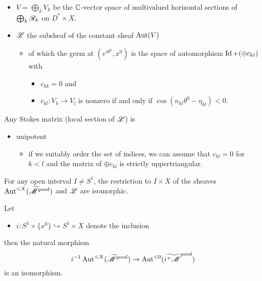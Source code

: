 \begin{itemize}
  \item $V=\bigoplus_kV_k$ be the $\mathbb{C}$-vector space of multivalued horizontal
    sections of $\bigoplus_k\mathscr{R}_k$ on $D^*\times X$.
  \item $\mathscr{L}$ the subsheaf of the constant sheaf $\operatorname{Aut}(V)$
    \begin{itemize}
      \item of which the germ at $(e^{i\theta^0},x^0)$ is
        the space of automorphism $\operatorname{Id}+(\oplus c_{kl})$ with
        \begin{itemize}
          \item $c_{kk}=0$ and
          \item $c_{kl}:V_k\to V_l$ is nonzero if and only if
            $\cos(n_{kl}\theta^0-\eta_{kl})<0$.
        \end{itemize}
    \end{itemize}
\end{itemize}
\begin{rem}
  Any Stokes matrix (local section of $\mathscr{L}$) is
  \begin{itemize}
    \item unipotent
      \begin{itemize}
        \item if we suitably order the set of indices, we can assume that
          $c_{kl}=0$ for $k<l$ and the matrix of $\oplus c_{kl}$ is strictly
          uppertriangular.
      \end{itemize}
  \end{itemize}
\end{rem}
\begin{cor}
  For any open interval $I\neq S^1$, the restriction to $I\times X$ of the
  sheaves $\operatorname{Aut}^{<X}(\widetilde{\mathscr{M}}^{good})$ and $\mathscr{L}$ are isomorphic.
  \begin{comment}
    \begin{proof}[Proof]
      Let $I\neq S^1$\dots
    \end{proof}
  \end{comment}
\end{cor}
\begin{cor}
  Let
  \begin{itemize}
    \item $i:S^1\times\{x^0\}\hookrightarrow S^1\times X$ denote the inclusion
  \end{itemize}
  then the natural morphism
  \[
    i^{-1}\operatorname{Aut}^{<X}(\widetilde{\mathscr{M}}^{good})\to\operatorname{Aut}^{<0}(\widetilde{i^+\mathscr{M}}^{good})
  \]
  is an isomorphism.
\end{cor}
